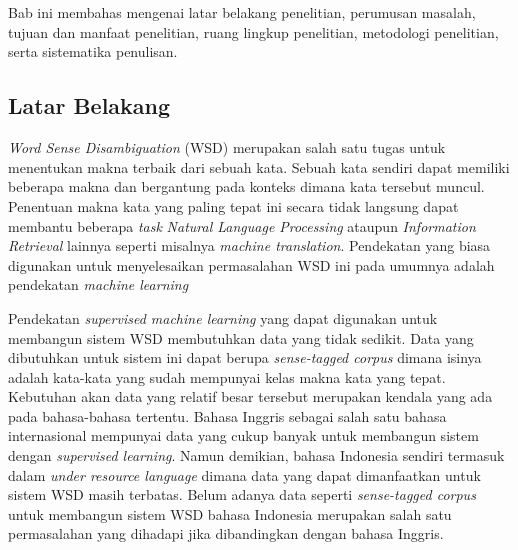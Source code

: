 \chapter{\babSatu}
Bab ini membahas mengenai latar belakang penelitian, perumusan masalah, tujuan dan manfaat penelitian, ruang lingkup penelitian, metodologi penelitian, serta sistematika penulisan.

\section{Latar Belakang}

\textit{Word Sense Disambiguation} (WSD) merupakan salah satu tugas untuk menentukan makna terbaik dari sebuah kata. Sebuah kata sendiri dapat memiliki beberapa makna dan bergantung pada konteks dimana kata tersebut muncul. Penentuan makna kata yang paling tepat ini secara tidak langsung dapat membantu beberapa \textit{task} \textit{Natural Language Processing} ataupun \textit{Information Retrieval} lainnya seperti misalnya \textit{machine translation}. Pendekatan yang biasa digunakan untuk menyelesaikan permasalahan WSD ini pada umumnya adalah pendekatan \textit{machine learning}


Pendekatan \textit{supervised machine learning} yang dapat digunakan untuk membangun sistem WSD membutuhkan data yang tidak sedikit. Data yang dibutuhkan untuk sistem ini dapat berupa \textit{sense-tagged corpus} dimana isinya adalah kata-kata yang sudah mempunyai kelas makna kata yang tepat. Kebutuhan akan data yang relatif besar tersebut merupakan kendala yang ada pada bahasa-bahasa tertentu. Bahasa Inggris sebagai salah satu bahasa internasional mempunyai data yang cukup banyak untuk membangun sistem dengan \textit{supervised learning}. Namun demikian, bahasa Indonesia sendiri termasuk dalam \textit{under resource language} dimana data yang dapat dimanfaatkan untuk sistem WSD masih terbatas. Belum adanya data seperti \textit{sense-tagged corpus} untuk membangun sistem WSD bahasa Indonesia merupakan salah satu permasalahan yang dihadapi jika dibandingkan dengan bahasa Inggris.

